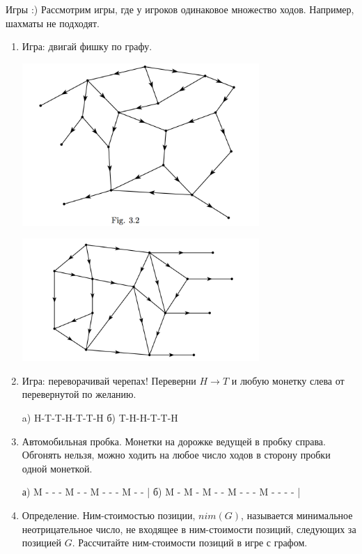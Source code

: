 \documentclass[12pt]{article} %
\begin{document}
Игры :) Рассмотрим игры, где у игроков одинаковое множество ходов. Например, шахматы не подходят.


\begin{enumerate}

\item Игра: двигай фишку по графу.

\begin{minipage}[c]{0.5\textwidth}
\centering
        \includegraphics[width=9cm]{figure/game_a.png}
\end{minipage}
\begin{minipage}[c]{0.5\textwidth}
\centering
        \includegraphics[width=9cm]{figure/game_b.png}
\end{minipage}

\item Игра: переворачивай черепах! Переверни $H\to T$ и любую монетку слева от перевернутой по желанию.

   a)   H-T-T-H-T-T-H    б)  T-H-H-T-T-H

\item Автомобильная пробка. Монетки на дорожке ведущей в пробку справа. Обгонять нельзя, можно ходить на любое число ходов в сторону пробки одной монеткой.

   а) M - - - M - - M - - - M - - |    б) M - M - M - - M - - - M - - - - |

\item Определение. Ним-стоимостью позиции, $nim(G)$, называется минимальное неотрицательное число, не входящее в ним-стоимости позиций, следующих за позицией $G$. Рассчитайте ним-стоимости позиций в игре с графом.



\end{enumerate}
\end{document}
